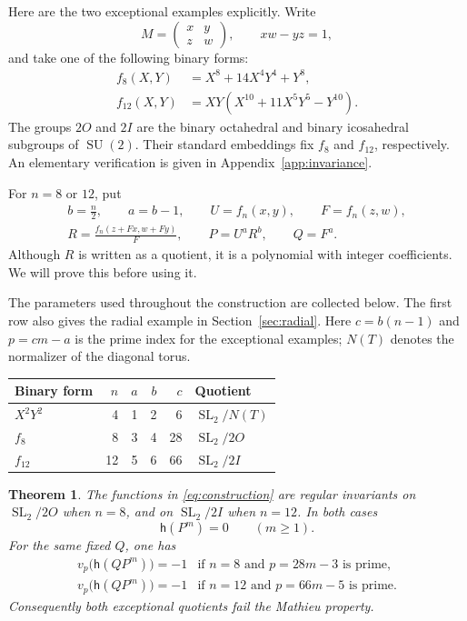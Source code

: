 \documentclass[11pt]{article}
\numberwithin{equation}{section}
\newtheorem{theorem}{Theorem}[section]
\theoremstyle{definition}
\theoremstyle{remark}
\newcommand{\h}{\mathsf h}
\newcommand{\SL}{\operatorname{SL}}
\newcommand{\SU}{\operatorname{SU}}
\begin{document}
Here are the two exceptional examples explicitly. Write
\[
 M=\begin{pmatrix}x&y\\z&w\end{pmatrix},\qquad xw-yz=1,
\]
and take one of the following binary forms:
\begin{equation}\label{eq:binaryforms}
 \begin{aligned}
 f_8(X,Y)&=X^8+14X^4Y^4+Y^8,\\
 f_{12}(X,Y)&=XY(X^{10}+11X^5Y^5-Y^{10}).
 \end{aligned}
\end{equation}
The groups $2O$ and $2I$ are the binary octahedral and binary icosahedral
subgroups of $\SU(2)$. Their standard embeddings fix $f_8$ and $f_{12}$,
respectively. An elementary verification is given in
Appendix~\ref{app:invariance}.

For $n=8$ or $12$, put
\begin{equation}\label{eq:construction}
 \begin{gathered}
 b=\frac n2,\qquad a=b-1,\qquad U=f_n(x,y),\qquad F=f_n(z,w),\\
 R=\frac{f_n(z+Fx,w+Fy)}{F},\qquad P=U^aR^b,\qquad Q=F^a.
 \end{gathered}
\end{equation}
Although $R$ is written as a quotient, it is a polynomial with integer
coefficients. We will prove this before using it.

The parameters used throughout the construction are collected below.
The first row also gives the radial example in Section~\ref{sec:radial}.
Here $c=b(n-1)$ and $p=cm-a$ is the prime index for the exceptional
examples; $N(T)$ denotes the normalizer of the diagonal torus.
\begin{center}
\begin{tabular}{@{}lrrrrl@{}}
\toprule
Binary form & $n$ & $a$ & $b$ & $c$ & Quotient \\
\midrule
$X^2Y^2$ & 4 & 1 & 2 & 6 & $\SL_2/N(T)$ \\
$f_8$ & 8 & 3 & 4 & 28 & $\SL_2/2O$ \\
$f_{12}$ & 12 & 5 & 6 & 66 & $\SL_2/2I$ \\
\bottomrule
\end{tabular}
\end{center}

\begin{theorem}\label{thm:exceptional}
The functions in \eqref{eq:construction} are regular invariants on
$\SL_2/2O$ when $n=8$, and on $\SL_2/2I$ when $n=12$. In both cases
\[
 \h(P^m)=0\qquad(m\geq1).
\]
For the same fixed $Q$, one has
\begin{equation}\label{eq:primevaluation}
 \begin{array}{ll}
 v_p\bigl(\h(QP^m)\bigr)=-1&\text{if }n=8\text{ and }p=28m-3
 \text{ is prime},\\
 v_p\bigl(\h(QP^m)\bigr)=-1&\text{if }n=12\text{ and }p=66m-5
 \text{ is prime}.
 \end{array}
\end{equation}
Consequently both exceptional quotients fail the Mathieu property.
\end{theorem}
\end{document}
